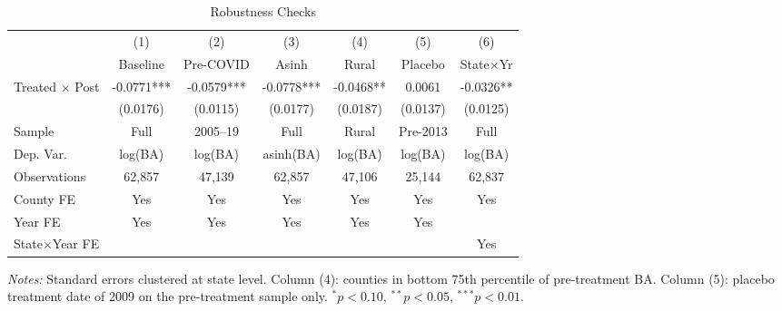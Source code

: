 \begin{table}[htbp]
\centering
\caption{Robustness Checks}
\label{tab:robust}
\begin{tabular}{lcccccc}
\hline\hline
 & (1) & (2) & (3) & (4) & (5) & (6) \\
 & Baseline & Pre-COVID & Asinh & Rural & Placebo & State$\times$Yr \\
\hline
Treated $\times$ Post & -0.0771*** & -0.0579*** & -0.0778*** & -0.0468** & 0.0061 & -0.0326** \\
 & (0.0176) & (0.0115) & (0.0177) & (0.0187) & (0.0137) & (0.0125) \\
\hline
Sample & Full & 2005--19 & Full & Rural & Pre-2013 & Full \\
Dep. Var. & log(BA) & log(BA) & asinh(BA) & log(BA) & log(BA) & log(BA) \\
Observations & 62,857 & 47,139 & 62,857 & 47,106 & 25,144 & 62,837 \\
County FE & Yes & Yes & Yes & Yes & Yes & Yes \\
Year FE & Yes & Yes & Yes & Yes & Yes & \\
State$\times$Year FE & & & & & & Yes \\
\hline\hline
\end{tabular}
\begin{tablenotes}[flushleft]\small
\item \textit{Notes:} Standard errors clustered at state level. Column (4): counties in bottom 75th percentile of pre-treatment BA. Column (5): placebo treatment date of 2009 on the pre-treatment sample only. $^{*}p<0.10$, $^{**}p<0.05$, $^{***}p<0.01$.
\end{tablenotes}
\end{table}
